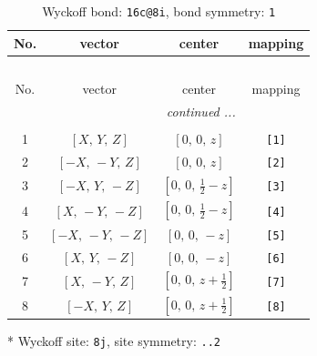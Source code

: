 \documentclass[fleqn,8pt]{jsarticle}
\begin{document}
\renewcommand{\arraystretch}{1.2}
\begin{longtable}{cccc}
\caption{Wyckoff bond: {\tt 16c@8i}, bond symmetry: {\tt 1}}
 \\
 \hline \hline
No. & vector & center & mapping \\ \hline \endfirsthead

\multicolumn{3}{l}{\tablename\ \thetable{}} \\
 \hline \hline
No. & vector & center & mapping \\ \hline \endhead

 \hline \hline
\multicolumn{3}{r}{\footnotesize\it continued ...} \\ \endfoot

 \hline \hline
\multicolumn{3}{r}{} \\ \endlastfoot

1 & $\left[ X,\, Y,\, Z \right]$ & $\left[ 0,\, 0,\, z \right]$ & {\tt [1]} \\ \hline
2 & $\left[ - X,\, - Y,\, Z \right]$ & $\left[ 0,\, 0,\, z \right]$ & {\tt [2]} \\ \hline
3 & $\left[ - X,\, Y,\, - Z \right]$ & $\left[ 0,\, 0,\, \frac{1}{2} - z \right]$ & {\tt [3]} \\ \hline
4 & $\left[ X,\, - Y,\, - Z \right]$ & $\left[ 0,\, 0,\, \frac{1}{2} - z \right]$ & {\tt [4]} \\ \hline
5 & $\left[ - X,\, - Y,\, - Z \right]$ & $\left[ 0,\, 0,\, - z \right]$ & {\tt [5]} \\ \hline
6 & $\left[ X,\, Y,\, - Z \right]$ & $\left[ 0,\, 0,\, - z \right]$ & {\tt [6]} \\ \hline
7 & $\left[ X,\, - Y,\, Z \right]$ & $\left[ 0,\, 0,\, z + \frac{1}{2} \right]$ & {\tt [7]} \\ \hline
8 & $\left[ - X,\, Y,\, Z \right]$ & $\left[ 0,\, 0,\, z + \frac{1}{2} \right]$ & {\tt [8]} \\
\end{longtable}
* Wyckoff site: {\tt 8j}, site symmetry: {\tt ..2}
\renewcommand{\arraystretch}{1.2}
\end{document}
